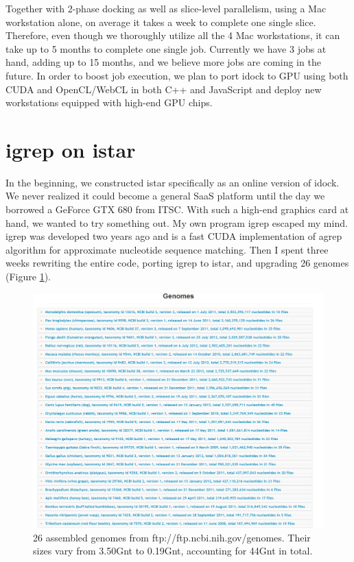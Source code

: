 Together with 2-phase docking as well as slice-level parallelism, using a Mac workstation alone, on average it takes a week to complete one single slice. Therefore, even though we thoroughly utilize all the 4 Mac workstations, it can take up to 5 months to complete one single job. Currently we have 3 jobs at hand, adding up to 15 months, and we believe more jobs are coming in the future. In order to boost job execution, we plan to port idock to GPU using both CUDA and OpenCL/WebCL in both C++ and JavaScript and deploy new workstations equipped with high-end GPU chips.

\section{igrep on istar}

In the beginning, we constructed istar specifically as an online version of idock. We never realized it could become a general SaaS platform until the day we borrowed a GeForce GTX 680 from ITSC. With such a high-end graphics card at hand, we wanted to try something out. My own program igrep \citep{1138} escaped my mind. igrep was developed two years ago and is a fast CUDA implementation of agrep algorithm for approximate nucleotide sequence matching. Then I spent three weeks rewriting the entire code, porting igrep to istar, and upgrading 26 genomes (Figure \ref{istar:Genomes}).

\begin{figure}
\centering
\includegraphics[width=\linewidth]{istar/Genomes.png}
\caption{26 assembled genomes from ftp://ftp.ncbi.nih.gov/genomes. Their sizes vary from 3.50Gnt to 0.19Gnt, accounting for 44Gnt in total.}
\label{istar:Genomes}
\end{figure}

